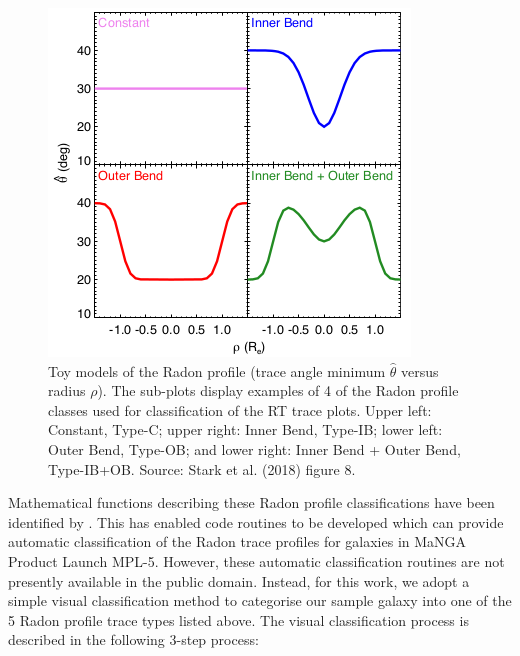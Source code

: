 \begin{figure}
    \centering
    \includegraphics[width=0.8\columnwidth]{images/RadonPlots/Radon-class-models.png}
    \caption{Toy models of the Radon profile (trace angle minimum $\hat\theta$ versus radius $\rho$). The sub-plots display examples of 4 of the Radon profile classes used for classification of the RT trace plots. Upper left: Constant, Type-C; upper right: Inner Bend, Type-IB; lower left: Outer Bend, Type-OB; and lower right: Inner Bend + Outer Bend, Type-IB+OB. Source: Stark et al. (2018) figure 8.}
    \label{fig:class-models}
\end{figure}

Mathematical functions describing these Radon profile classifications have been identified by \citet[][section 3.6]{2018MNRAS.480.2217S}. This has enabled code routines to be developed which can provide automatic classification of the Radon trace profiles for galaxies in MaNGA Product Launch MPL-5. However, these automatic classification routines are not presently available in the public domain. Instead, for this work, we adopt a simple visual classification method to categorise our sample galaxy into one of the 5 Radon profile trace types listed above. The visual classification process is described in the following 3-step process:

